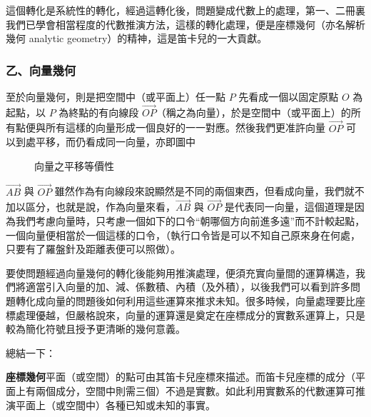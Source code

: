 這個轉化是系統性的轉化，經過這轉化後，問題變成代數上的處理，第一、二冊裏我們已學會相當程度的代數推演方法，這樣的轉化處理，便是座標幾何（亦名解析幾何 analytic geometry）的精神，這是笛卡兒的一大貢獻。

\subsubsection*{乙、向量幾何}

至於向量幾何，則是把空間中（或平面上）任一點 $P$ 先看成一個以固定原點 $O$ 為起點，以 $P$ 為終點的有向線段 $\vec{OP}$（稱之為向量），於是空間中（或平面上）的所有點便與所有這樣的向量形成一個良好的一一對應。然後我們更准許向量 $\vec{OP}$ 可以到處平移，而仍看成同一向量，亦即圖中

\begin{figure}[H]
\centering
{}
\caption{向量之平移等價性}
\label{fig:b3s-fig1-7}
\end{figure}

$\vec{AB}$ 與 $\vec{OP}$ 雖然作為有向線段來說顯然是不同的兩個東西，但看成向量，我們就不加以區分，也就是說，作為向量來看，$\vec{AB}$ 與 $\vec{OP}$ 是代表同一向量，這個道理是因為我們考慮向量時，只考慮一個如下的口令“朝哪個方向前進多遠”而不計較起點，一個向量便相當於一個這樣的口令，（執行口令皆是可以不知自己原來身在何處，只要有了羅盤針及距離表便可以照做）。

要使問題經過向量幾何的轉化後能夠用推演處理，便須充實向量間的運算構造，我們將適當引入向量的加、減、係數積、內積（及外積），以後我們可以看到許多問題轉化成向量的問題後如何利用這些運算來推求未知。很多時候，向量處理要比座標處理優越，但嚴格說來，向量的運算還是奠定在座標成分的實數系運算上，只是較為簡化符號且授予更清晰的幾何意義。

總結一下：

\textbf{座標幾何}\quad 平面（或空間）的點可由其笛卡兒座標來描述。而笛卡兒座標的成分（平面上有兩個成分，空間中則需三個）不過是實數。如此利用實數系的代數運算可推演平面上（或空間中）各種已知或未知的事實。

